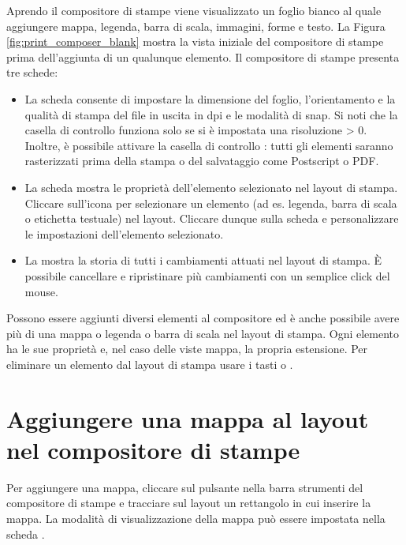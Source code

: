 Aprendo il compositore di stampe viene visualizzato un foglio bianco al quale
aggiungere mappa, legenda, barra di scala, immagini, forme e testo. La Figura
\ref{fig:print_composer_blank} mostra la vista iniziale del compositore di
stampe prima dell'aggiunta di un qualunque elemento. 
Il compositore di stampe presenta tre schede:

\begin{itemize}[label=--]
\item La scheda  consente di impostare la dimensione del
foglio, l'orientamento e la qualità di stampa del file in uscita in dpi e 
le modalità di snap. Si noti che la casella di controllo  
funziona solo se si è impostata una risoluzione > 0. Inoltre, è possibile attivare 
la casella di controllo : tutti gli elementi saranno 
rasterizzati prima della stampa o del salvataggio come Postscript o PDF.
\item La scheda  mostra le proprietà dell'elemento selezionato
nel layout di stampa. 
Cliccare sull'icona  
per selezionare un elemento (ad es. legenda, barra di scala o etichetta
testuale) nel layout. Cliccare dunque sulla scheda  e
personalizzare le impostazioni dell'elemento selezionato.
\item La  mostra la storia di tutti i cambiamenti attuati nel 
layout di stampa. È possibile cancellare e ripristinare più cambiamenti con un semplice 
click del mouse.
\end{itemize}

Possono essere aggiunti diversi elementi al compositore ed è anche
possibile avere più di una mappa o legenda o barra di scala nel layout
di stampa. Ogni elemento ha le sue proprietà e, nel caso delle viste mappa, la
propria estensione. Per eliminare un elemento dal layout di stampa usare i tasti 
 o .

\section{Aggiungere una mappa al layout nel compositore di stampe}

Per aggiungere una mappa, cliccare sul pulsante  
nella barra strumenti del compositore di stampe e tracciare sul layout un rettangolo in cui inserire la mappa. 
La modalità di visualizzazione della mappa può essere impostata nella scheda .

